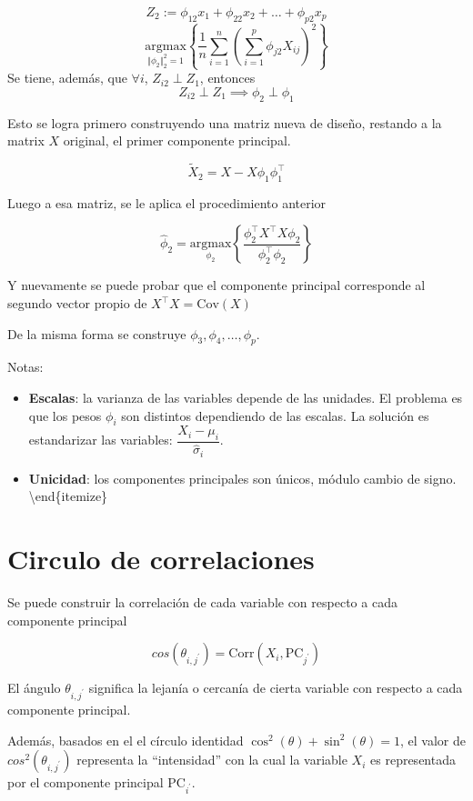 \documentclass[
  12pt,
]{book}
\providecommand{\tightlist}{%
  \setlength{\itemsep}{0pt}\setlength{\parskip}{0pt}}
\theoremstyle{definition}
\theoremstyle{definition}
\theoremstyle{definition}
\theoremstyle{remark}
\begin{document}
\[ Z_{2}:= \phi_{12}x_1 + \phi_{22}x_2+\dots+\phi_{p2}x_p\]
\[\underset{\Vert\phi_2\Vert_2^2=1}{\mathrm{argmax}} \left\lbrace\dfrac{1}{n}\sum_{i=1}^{n}\left(\sum_{i=1}^p \phi_{j2} X_{ij} \right)^2 \right\rbrace\]
Se tiene, además, que \(\forall i\), \(Z_{i2}\perp Z_1\), entonces
\[ Z_{i2}\perp Z_1 \implies \phi_{2} \perp \phi_{1}\]

Esto se logra primero construyendo una matriz nueva de diseño, restando a la matrix \(X\) original, el primer componente principal.

\[
\tilde{X}_2 = X - X\phi_1\phi_1^\top
\]

Luego a esa matriz, se le aplica el procedimiento anterior

\[
\hat{\phi}_2 = \underset{\phi_2}{\mathrm{argmax}} \left\{\frac{\phi_2^\top X^\top X \phi_2 }{\phi_2^\top \phi_2}\right\}
\]

Y nuevamente se puede probar que el componente principal corresponde al segundo vector propio de
\(X^\top X = \mathrm{Cov}(X)\)

De la misma forma se construye \(\phi_3,\phi_4,\dots, \phi_p\).

Notas:

\begin{itemize}
\tightlist
\item
  \textbf{Escalas}: la varianza de las variables depende de las unidades. El problema es que los pesos \(\phi_i\) son distintos dependiendo de las escalas. La solución es estandarizar las variables: \(\dfrac{X_i-\mu_i}{\hat\sigma_i}\).
\item
  \textbf{Unicidad}: los componentes principales son únicos, módulo cambio de signo.
  \textbackslash end\{itemize\}
\end{itemize}

\hypertarget{circulo-de-correlaciones}{%
\section{Circulo de correlaciones}\label{circulo-de-correlaciones}}

Se puede construir la correlación de cada variable con respecto a cada componente principal

\[
cos(\theta_{i,j^\prime}) = \mathrm{Corr}(X_i, \mathrm{PC}_{j^\prime})
\]

El ángulo \(\theta_{i,j^\prime}\) significa la lejanía o cercanía de cierta variable con respecto a cada componente principal.

Además, basados en el el círculo identidad \(\cos^2(\theta)+\sin^2(\theta)=1\), el valor de \(cos^2(\theta_{i,j^\prime})\) representa la ``intensidad'' con la cual la variable \(X_i\) es representada por el componente principal \(\mathrm{PC}_{i^\prime}\).
\end{document}
